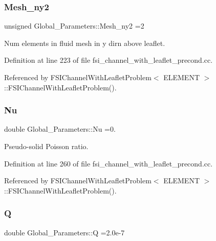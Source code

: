 \subsubsection{\texorpdfstring{Mesh\+\_\+ny2}{Mesh\_ny2}}
{\footnotesize\ttfamily unsigned Global\+\_\+\+Parameters\+::\+Mesh\+\_\+ny2 =2}



Num elements in fluid mesh in y dirn above leaflet. 



Definition at line 223 of file fsi\+\_\+channel\+\_\+with\+\_\+leaflet\+\_\+precond.\+cc.



Referenced by F\+S\+I\+Channel\+With\+Leaflet\+Problem$<$ E\+L\+E\+M\+E\+N\+T $>$\+::\+F\+S\+I\+Channel\+With\+Leaflet\+Problem().

\mbox{\label{namespaceGlobal__Parameters_a20fccdcfa2c15ad8b951b9ada3bb1661}} 
\subsubsection{\texorpdfstring{Nu}{Nu}}
{\footnotesize\ttfamily double Global\+\_\+\+Parameters\+::\+Nu =0.}



Pseudo-\/solid Poisson ratio. 



Definition at line 260 of file fsi\+\_\+channel\+\_\+with\+\_\+leaflet\+\_\+precond.\+cc.



Referenced by F\+S\+I\+Channel\+With\+Leaflet\+Problem$<$ E\+L\+E\+M\+E\+N\+T $>$\+::\+F\+S\+I\+Channel\+With\+Leaflet\+Problem().

\mbox{\label{namespaceGlobal__Parameters_a7814fddf663e56168174a42d2cd6b4c1}} 
\subsubsection{\texorpdfstring{Q}{Q}}
{\footnotesize\ttfamily double Global\+\_\+\+Parameters\+::Q =2.\+0e-\/7}




